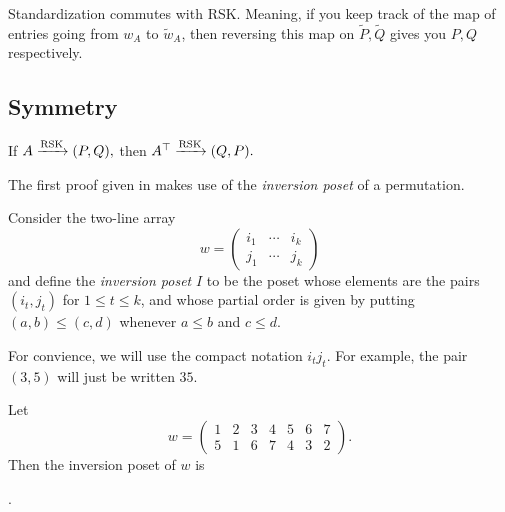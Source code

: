 \documentclass{article}
\DeclareMathOperator{\RSK}{RSK}
\newcommand{\rskarrow}{\ensuremath\xrightarrow{\RSK}}
\begin{document}
\begin{lemma}
    Standardization commutes with RSK.
    Meaning, if you keep track of the map of entries going from $w_A$ to $\widetilde{w}_A$, then reversing this map on $\widetilde{P},\widetilde{Q}$ gives you $P,Q$ respectively.
\end{lemma}
\fi
\subsection{Symmetry}

\begin{theorem}\label{thm:rsksymmetry}
    If $A \rskarrow (P,Q),$ then $A^\top \rskarrow (Q,P).$
\end{theorem}

The first proof given in \cite{Stanley} makes use of the \textit{inversion poset} of a permutation.

\begin{definition}
    Consider the two-line array
    \[
        w = \begin{pmatrix}
            i_1 & \cdots & i_k \\
            j_1 & \cdots & j_k
        \end{pmatrix}
    \]
    and define the \textit{inversion poset} $I$ to be the poset whose elements are the pairs $(i_t, j_t)$ for $1 \leq t \leq k$, and whose partial order is given by putting $(a,b) \leq (c,d)$ whenever $a \leq b$ and $c \leq d$.
\end{definition}

For convience, we will use the compact notation $i_tj_t$.
For example, the pair $(3,5)$ will just be written $35$.

\begin{example}\label{ex:invposet}
    Let
    \[
        w = \begin{pmatrix}
            1 & 2 & 3 & 4 & 5 & 6 & 7 \\
            5 & 1 & 6 & 7 & 4 & 3 & 2
        \end{pmatrix}.
    \]
    Then the inversion poset of $w$ is 
    \begin{center}
        .
    \end{center}
\end{example}
\end{document}

